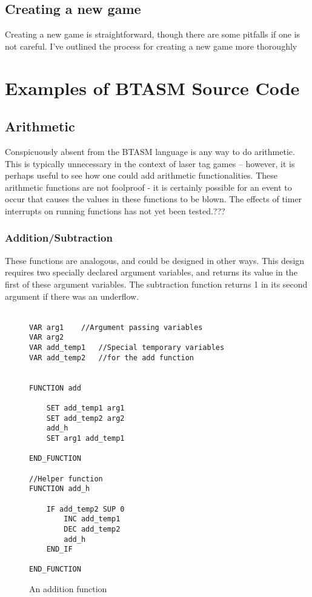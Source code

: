 \documentclass[12pt,a4paper]{scrbook}
\begin{document}
\section{Creating a new game}
Creating a new game is straightforward, though there are some pitfalls if one is not careful.  I've
outlined the process for creating a new game more thoroughly 
\chapter{Examples of BTASM Source Code}

\section{Arithmetic}
Conspicuously absent from the BTASM language is any way to do arithmetic.  This is typically 
unnecessary in the context of laser tag games -- however, it is perhaps useful to see how one could
add arithmetic functionalities.  
These arithmetic functions are not foolproof - it is certainly possible for an event to occur that
causes the values in these functions to be blown.  The effects of timer interrupts on running 
functions has not yet been tested.???

\subsection{Addition/Subtraction}
These functions are analogous, and could be designed in other ways.  This design requires two 
specially declared argument variables, and returns its value in the first of these argument 
variables.  The subtraction function returns 1 in its second argument if there was an underflow.
\\\\
\begin{figure}[h]
\begin{lstlisting}
VAR arg1	//Argument passing variables
VAR arg2
VAR add_temp1	//Special temporary variables
VAR add_temp2	//for the add function


FUNCTION add

	SET add_temp1 arg1
	SET add_temp2 arg2
	add_h
	SET arg1 add_temp1
	
END_FUNCTION

//Helper function
FUNCTION add_h

	IF add_temp2 SUP 0
		INC add_temp1
		DEC add_temp2
		add_h
	END_IF
	
END_FUNCTION
\end{lstlisting}
\caption{An addition function} 
\end{figure}
\end{document}
